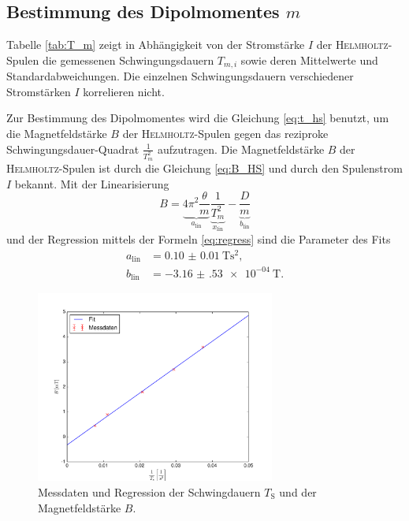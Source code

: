 \subsection{Bestimmung des Dipolmomentes \texorpdfstring{$m$}{m}}
\label{sec:auswertung2}
Tabelle \ref{tab:T_m} zeigt in Abhängigkeit von der Stromstärke $I$ der \textsc{Helmholtz}-Spulen die gemessenen Schwingungsdauern $T_{m,i}$ sowie deren Mittelwerte und Standardabweichungen. 
Die einzelnen Schwingungsdauern verschiedener Stromstärken $I$ korrelieren nicht.

Zur Bestimmung des Dipolmomentes wird die Gleichung \eqref{eq:t_hs} benutzt, um die Magnetfeldstärke $B$ 
der \textsc{Helmholtz}-Spulen gegen das reziproke Schwingungsdauer-Quadrat $\frac{1}{T_{m}^2}$ aufzutragen.
Die Magnetfeldstärke $B$ der \textsc{Helmholtz}-Spulen ist durch die Gleichung \eqref{eq:B_HS} und durch den Spulenstrom $I$ bekannt.
Mit der Linearisierung
\begin{equation}
	B = \underbrace{4\pi^2\frac{\theta}{m}}_{a_\text{lin}} \underbrace{\frac{1}{T_m^2}}_{x_\text{lin}} - \underbrace{\frac{D}{m}}_{b_\text{lin}}
	\label{eq:B_lin}
\end{equation}
und der Regression mittels der Formeln \eqref{eq:regress}
sind die Parameter des Fits
\begin{align}
	a_\text{lin}&=	\SI{0.10(1)}{\tesla\second\squared}, \\%
	b_\text{lin}&=	-\SI{3.16(53)e-04}{\tesla}.
\end{align}
\begin{figure}[p]
	\centering
	\includegraphics[width=0.7\textwidth]{Bilder/Magnetfeld.pdf}
	\caption{Messdaten und Regression der Schwingdauern $T_\text{S}$ und der Magnetfeldstärke $B$.}
	\label{fig:Magnetfeld}
\end{figure}
